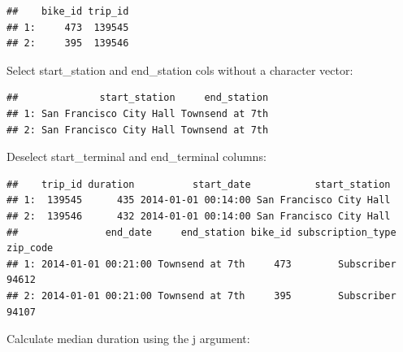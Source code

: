 \documentclass[]{book}
\newenvironment{Shaded}{\begin{snugshade}}{\end{snugshade}}
\newcommand{\DecValTok}[1]{\textcolor[rgb]{0.00,0.00,0.81}{#1}}
\newcommand{\KeywordTok}[1]{\textcolor[rgb]{0.13,0.29,0.53}{\textbf{#1}}}
\newcommand{\NormalTok}[1]{#1}
\newcommand{\OperatorTok}[1]{\textcolor[rgb]{0.81,0.36,0.00}{\textbf{#1}}}
\newcommand{\StringTok}[1]{\textcolor[rgb]{0.31,0.60,0.02}{#1}}
\begin{document}
\begin{verbatim}
##    bike_id trip_id
## 1:     473  139545
## 2:     395  139546
\end{verbatim}

Select start\_station and end\_station cols without a character vector:

\begin{Shaded}
\end{Shaded}

\begin{verbatim}
##              start_station     end_station
## 1: San Francisco City Hall Townsend at 7th
## 2: San Francisco City Hall Townsend at 7th
\end{verbatim}

Deselect start\_terminal and end\_terminal columns:

\begin{Shaded}
\end{Shaded}

\begin{verbatim}
##    trip_id duration          start_date           start_station
## 1:  139545      435 2014-01-01 00:14:00 San Francisco City Hall
## 2:  139546      432 2014-01-01 00:14:00 San Francisco City Hall
##               end_date     end_station bike_id subscription_type zip_code
## 1: 2014-01-01 00:21:00 Townsend at 7th     473        Subscriber    94612
## 2: 2014-01-01 00:21:00 Townsend at 7th     395        Subscriber    94107
\end{verbatim}

Calculate median duration using the j argument:

\begin{Shaded}
\end{Shaded}
\end{document}
